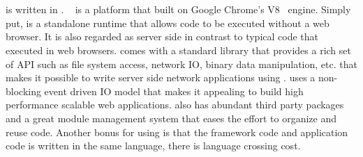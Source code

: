 








\section{\nodejs}

\cb is written in \nodejs.
\nodejs~\cite{tilkov2010node} is a platform that built on Google Chrome's V8~\cite{v8} \js engine.
Simply put, \nodejs is a standalone \js runtime that allows \js code to be
executed without a web browser.
It is also regarded as server side \js in contrast to typical \js code that executed in 
web browsers.
\nodejs comes with a standard library that provides a rich set of API 
such as file system access, network IO, binary data manipulation, etc. 
that makes it possible to write server side network applications using \js.
\nodejs uses a non-blocking event driven IO model that makes it appealing to
build high performance scalable web applications.
\nodejs also has abundant third party packages
and a great module management system that eases the effort to organize and reuse code.
Another bonus for using \nodejs is that the \cb framework code and application code
is written in the same language, there is language crossing cost.


